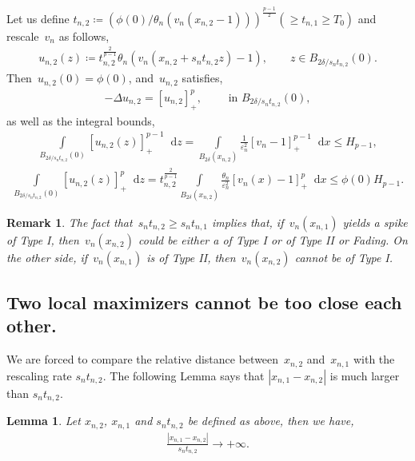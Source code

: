 \documentclass[10pt]{amsart}
\newcommand{\parenthesis}[1]{\left(#1\right)} %
\newcommand{\dd}{\mathop{}\!\mathrm{d}}
\newcommand{\eps}{\varepsilon}
\renewcommand{\to}{\rightarrow}
\newtheorem{lemma}[theorem]{Lemma}
\newtheorem{remark}[theorem]{Remark}
\begin{document}
    Let us define $t_{n,2}\coloneqq \parenthesis{\phi(0)/ \theta_n (v_n(x_{n,2}-1))}^{\frac{p-1}{2}}(\geq t_{n,1}\geq T_0)$ and
    rescale~$v_n$ as follows,
    \begin{align}\label{eq:un2 def}
        u_{n,2}(z)\coloneqq t_{n,2}^{\frac{2}{p-1}} \theta_n \parenthesis{ v_n(x_{n,2}+ s_{n} t_{n,2} z)-1 }, \qquad z\in B_{{2\delta} / {s_n t_{n,2}}}(0).
    \end{align}
    Then~$u_{n,2}(0)=\phi(0)$, and~$u_{n,2}$ satisfies,
    \begin{align*}
        -\Delta u_{n,2} = [u_{n,2}]_+^p, \qquad \mbox{ in }  B_{{2\delta} / {s_n t_{n,2}}}(0),
    \end{align*}
    as well as the integral bounds,
    \begin{align*}
        \int\limits_{B_{2\delta/ s_n t_{n,2}}(0)} [u_{n,2}(z)]_+^{p-1}\dd{z}
        = \int\limits_{B_{2\delta}(x_{n,2})}  \frac{1}{\eps_n^2}[v_{n}-1]_+^{p-1} \dd{x}\leq H_{p-1},
    \end{align*}
    \begin{align*}
        \int\limits_{B_{2\delta/s_n t_{n,2}} (0)} [u_{n,2}(z)]_+^p \dd{z}
        =t_{n,2}^{\frac{2}{p-1}}\int\limits_{B_{2\delta}(x_{n,2})} \frac{\theta_n}{\eps_n^2}[v_n(x)-1]_+^p\dd{x}
        \leq \phi(0)H_{p-1}.
    \end{align*}

    \begin{remark}\label{rem:typeIvsII}
    The fact that~$s_n t_{n,2}\geq s_n t_{n,1}$ implies that, if~$v_n(x_{n,1})$ yields a spike of Type I, then~$v_n(x_{n,2})$ could be either a
    of Type I or of Type II or Fading. On the other side, if~$v_n(x_{n,1})$ is of Type II,
    then~$v_n(x_{n,2})$ cannot be of Type I.
\end{remark}



\subsection{Two local maximizers cannot be too close each other.}\label{subs:5.1}

    We are forced to compare the relative distance between~$x_{n,2}$ and~$x_{n,1}$ with the rescaling rate $s_n t_{n,2}$.
    The following Lemma says that $|x_{n,1}-x_{n,2}|$ is much larger than $s_n t_{n,2}$.
    \begin{lemma}\label{lemma:rel dist}
       Let $x_{n,2}$, $x_{n,1}$ and $s_n t_{n,2}$ be defined as above, then we have,
        \begin{align}\label{eq:far I}
            \frac{|x_{n,1}-x_{n,2}|}{s_n t_{n,2}}\to+\infty.
        \end{align}
    \end{lemma}
\end{document}
